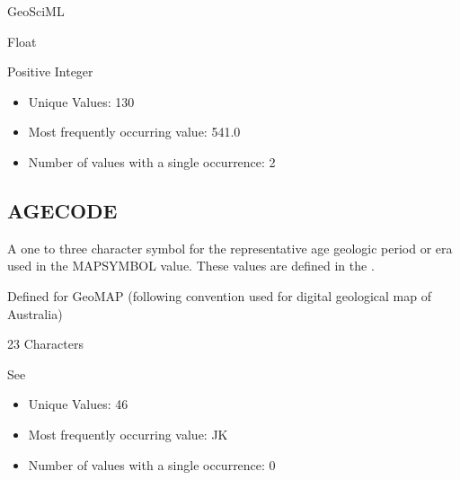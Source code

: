 \documentclass[letterpaper,10pt,english]{sphinxmanual}
\begin{document}
GeoSciML

Float


Positive Integer

\begin{itemize}
\item {} 
Unique Values: 130

\item {} 
Most frequently occurring value: 541.0

\item {} 
Number of values with a single occurrence: 2

\end{itemize}


\subsection{AGECODE}
\label{\detokenize{field_glossary:agecode}}
A one to three character symbol for the representative age geologic period or era used in the MAPSYMBOL value. These values are defined in the {\hyperref[\detokenize{legend::doc}]{}}.

Defined for GeoMAP (following convention used for digital geological map of Australia)

2\sphinxhyphen{}3 Characters


See {\hyperref[\detokenize{legend::doc}]{}}

\begin{itemize}
\item {} 
Unique Values: 46

\item {} 
Most frequently occurring value: JK

\item {} 
Number of values with a single occurrence: 0

\end{itemize}
\end{document}
